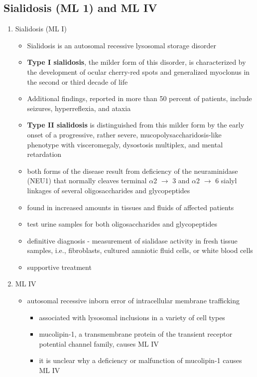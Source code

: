 \documentclass{scrartcl}
\begin{document}
\subsection{Sialidosis (ML 1) and ML IV}
\label{sec:org8ce4f10}

\begin{enumerate}
\item Sialidosis (ML I)
\label{sec:org24a7998}
\begin{itemize}
\item Sialidosis is an autosomal recessive lysosomal storage disorder
\item \textbf{Type I sialidosis}, the milder form of this disorder, is
characterized by the development of ocular cherry-red spots and
generalized myoclonus in the second or third decade of life
\item Additional findings, reported in more than 50 percent of patients,
include seizures, hyperreflexia, and ataxia

\item \textbf{Type II sialidosis} is distinguished from this milder form by the
early onset of a progressive, rather severe,
mucopolysaccharidosis-like phenotype with visceromegaly, dysostosis
multiplex, and mental retardation

\item both forms of the disease result from deficiency of the
neuraminidase (NEU1) that normally cleaves terminal \(\alpha\)2 \(\to\) 3 and
\(\alpha\)2 \(\to\) 6 sialyl linkages of several oligosaccharides and glycopeptides

\item found in increased amounts in tissues and fluids of affected patients

\item test urine samples for both oligosaccharides and glycopeptides

\item definitive diagnosis - measurement of sialidase activity in fresh tissue
samples, i.e., fibroblasts, cultured amniotic fluid cells, or white
blood cells

\item supportive treatment
\end{itemize}

\item ML IV
\label{sec:org10cb8e9}

\begin{itemize}
\item autosomal recessive inborn error of intracellular membrane trafficking
\begin{itemize}
\item associated with lysosomal inclusions in a variety of cell types
\item mucolipin-1, a transmembrane protein of the transient receptor
potential channel family, causes ML IV
\item it is unclear why a deficiency or malfunction of mucolipin-1 causes ML IV
\end{itemize}


\end{itemize}
\end{enumerate}
\end{document}

